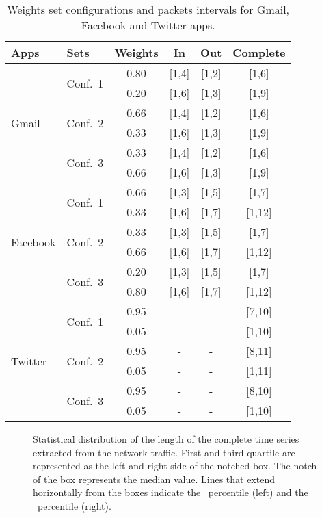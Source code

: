 \documentclass{acm_proc_article-sp}
\begin{document}
\begin{table}[h!]
       \centering
        \begin{center}
\begin{tabular}[t]{|l|l|c|c|c|c|}\hline
\textbf{{Apps}} & \textbf{{Sets}} & \textbf{{Weights}} & \textbf{{In}} & \textbf{{Out}} & \textbf{{Complete}} \\
\hline
\multirow{6}{*}{{Gmail}} 
& \multirow{2}{*}{{Conf.~1}} & 0.80 & [1,4]& [1,2]& [1,6] \\
		                 &  & 0.20 & [1,6]& [1,3]& [1,9]\\ \cline{2-6}
& \multirow{2}{*}{{Conf.~2}} & 0.66 & [1,4]& [1,2]& [1,6] \\
		                 &  & 0.33 & [1,6]& [1,3]& [1,9]\\ \cline{2-6}
& \multirow{2}{*}{{Conf.~3}} & 0.33 & [1,4]& [1,2]& [1,6] \\
		                 &  & 0.66 & [1,6]& [1,3]& [1,9]\\
\hline \multirow{6}{*}{{Facebook}}
& \multirow{2}{*}{{Conf.~1}} & 0.66 & [1,3]& [1,5]& [1,7] \\
				 &  & 0.33 & [1,6]& [1,7]& [1,12]\\ \cline{2-6}
& \multirow{2}{*}{{Conf.~2}} & 0.33 & [1,3]& [1,5]& [1,7] \\
				 &  & 0.66 & [1,6]& [1,7]& [1,12]\\ \cline{2-6}
& \multirow{2}{*}{{Conf.~3}} & 0.20 & [1,3]& [1,5]& [1,7] \\
				 &  & 0.80 & [1,6]& [1,7]& [1,12]\\ \cline{2-6}
\hline \multirow{6}{*}{{Twitter}} 
& \multirow{2}{*}{{Conf.~1}} & 0.95 & - & - &  [7,10] \\ &  &  0.05 & - & -& [1,10]\\ \cline{2-6}
 & \multirow{2}{*}{{Conf.~2}} & 0.95 & - & -& [8,11] \\ &  &  0.05 & - & -& [1,11]\\ \cline{2-6}
& \multirow{2}{*}{{Conf.~3}} & 0.95 & - & -& [8,10] \\ &  &  0.05 & - & -& [1,10]\\ 
\hline

\end{tabular}
        \end{center}
\caption{Weights set configurations and packets intervals for Gmail, Facebook and Twitter apps.}
\label{tab:weights}
\end{table}    


\begin{figure}[h!]
    \centering
{}
    \caption{Statistical distribution of the length of the complete time series 
extracted from the network traffic. First and third quartile are 
represented as the left and right side of the notched box. The notch of the box 
represents the median value. Lines that extend horizontally from the boxes 
indicate the ~percentile (left) and the ~percentile (right).}
    \label{fig:distributionflowlength}
  \end{figure}
\end{document}
